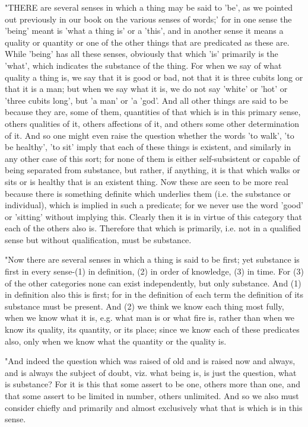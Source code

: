 "THERE are several senses in which a thing may be said to 'be', as
we pointed out previously in our book on the various senses of words;'
for in one sense the 'being' meant is 'what a thing is' or a 'this',
and in another sense it means a quality or quantity or one of the
other things that are predicated as these are. While 'being' has all
these senses, obviously that which 'is' primarily is the 'what', which
indicates the substance of the thing. For when we say of what quality
a thing is, we say that it is good or bad, not that it is three cubits
long or that it is a man; but when we say what it is, we do not say
'white' or 'hot' or 'three cubits long', but 'a man' or 'a 'god'.
And all other things are said to be because they are, some of them,
quantities of that which is in this primary sense, others qualities
of it, others affections of it, and others some other determination
of it. And so one might even raise the question whether the words
'to walk', 'to be healthy', 'to sit' imply that each of these things
is existent, and similarly in any other case of this sort; for none
of them is either self-subsistent or capable of being separated from
substance, but rather, if anything, it is that which walks or sits
or is healthy that is an existent thing. Now these are seen to be
more real because there is something definite which underlies them
(i.e. the substance or individual), which is implied in such a predicate;
for we never use the word 'good' or 'sitting' without implying this.
Clearly then it is in virtue of this category that each of the others
also is. Therefore that which is primarily, i.e. not in a qualified
sense but without qualification, must be substance. 

"Now there are several senses in which a thing is said to be first;
yet substance is first in every sense-(1) in definition, (2) in order
of knowledge, (3) in time. For (3) of the other categories none can
exist independently, but only substance. And (1) in definition also
this is first; for in the definition of each term the definition of
its substance must be present. And (2) we think we know each thing
most fully, when we know what it is, e.g. what man is or what fire
is, rather than when we know its quality, its quantity, or its place;
since we know each of these predicates also, only when we know what
the quantity or the quality is. 

"And indeed the question which was raised of old and is raised now
and always, and is always the subject of doubt, viz. what being is,
is just the question, what is substance? For it is this that some
assert to be one, others more than one, and that some assert to be
limited in number, others unlimited. And so we also must consider
chiefly and primarily and almost exclusively what that is which is
in this sense. 

